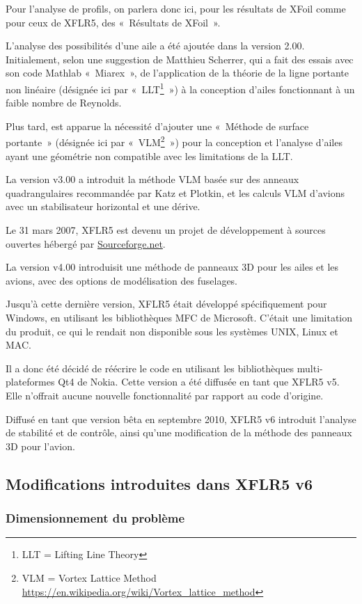 \documentclass[a4paper,twoside,12pt,dvips]{article}
\begin{document}
Pour l’analyse de profils, on parlera donc ici, pour les résultats de XFoil comme pour ceux de XFLR5, des «~Résultats de XFoil~».

L’analyse des possibilités d’une aile a été ajoutée dans la version 2.00. 
Initialement, selon une suggestion de Matthieu Scherrer, qui a fait
des essais avec son code Mathlab «~Miarex~», de l’application de la théorie
de la ligne portante non linéaire (désignée ici par «~LLT\footnote{LLT =
Lifting Line Theory}~») à la conception d’ailes fonctionnant à un faible
nombre de Reynolds.

Plus tard, est apparue la nécessité d’ajouter une «~Méthode de surface portante~» (désignée ici par «~VLM\footnote{VLM = Vortex Lattice Method \url{https://en.wikipedia.org/wiki/Vortex_lattice_method}}~») pour la conception et l’analyse d’ailes ayant une géométrie non compatible
avec les limitations de la LLT. 

La version v3.00 a introduit la méthode VLM basée sur des anneaux
quadrangulaires recommandée par Katz et Plotkin, et les calculs VLM
d’avions avec un stabilisateur horizontal et une dérive. 

Le 31 mars 2007, XFLR5 est devenu un projet de développement à sources 
ouvertes hébergé par \href{https://sourceforge.net/projects/xflr5/}{Sourceforge.net}.

La version v4.00 introduisit une méthode de panneaux 3D pour les ailes et 
les avions, avec des options de modélisation des fuselages. 

Jusqu’à cette dernière version, XFLR5 était développé spécifiquement pour Windows, en utilisant les bibliothèques MFC de Microsoft. C’était une limitation du produit, ce qui le rendait non disponible sous les systèmes UNIX, Linux et MAC.

Il a donc été décidé de réécrire le code en utilisant les bibliothèques 
multi-plateformes Qt4 de Nokia. Cette version a été diffusée en tant que
XFLR5 v5. Elle n’offrait aucune nouvelle fonctionnalité par rapport au code
d’origine.

Diffusé en tant que version bêta en septembre 2010, XFLR5 v6 introduit
l’analyse de stabilité et de contrôle, ainsi qu’une modification de la
méthode des panneaux 3D pour l’avion.

\subsection{Modifications introduites dans XFLR5 v6}

\subsubsection{Dimensionnement du problème}
\end{document}
